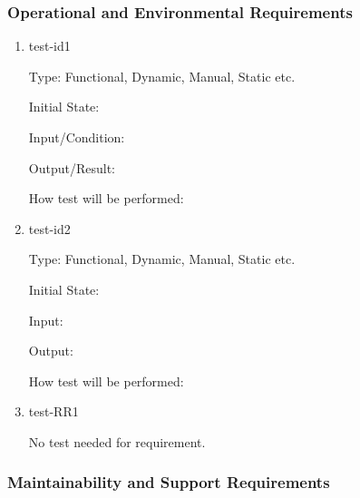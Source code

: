 \documentclass[12pt, titlepage]{article}
\begin{document}
\subsubsection{Operational and Environmental Requirements}
\begin{enumerate}

  \item{test-id1\\}
  
  Type: Functional, Dynamic, Manual, Static etc.
            
  Initial State: 
            
  Input/Condition: 
            
  Output/Result: 
            
  How test will be performed: 
            
  \item{test-id2\\}
  
  Type: Functional, Dynamic, Manual, Static etc.
            
  Initial State: 
            
  Input: 
            
  Output: 
            
  How test will be performed: 

  \item{test-RR1\\}

  No test needed for requirement.
  
  \end{enumerate}

\subsubsection{Maintainability and Support Requirements}
\end{document}
